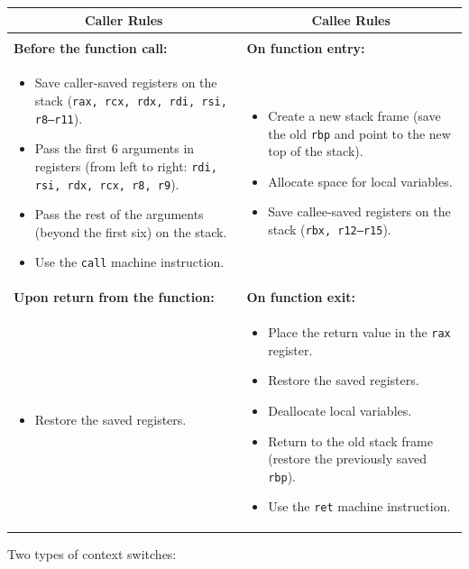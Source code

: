 \documentclass[openany,12pt]{book}
\begin{document}
\begin{tabularx}{\textwidth}{|X|X|}
\hline
\multicolumn{1}{|c|}{\textbf{Caller Rules}} & \multicolumn{1}{c|}{\textbf{Callee Rules}} \\
\hline
 & \\
\textbf{Before the function call:} & \textbf{On function entry:} \\
\begin{itemize}
    \item Save caller-saved registers on the stack (\texttt{rax, rcx, rdx, rdi, rsi, r8–r11}).
    \item Pass the first 6 arguments in registers (from left to right: \texttt{rdi, rsi, rdx, rcx, r8, r9}).
    \item Pass the rest of the arguments (beyond the first six) on the stack.
    \item Use the \texttt{call} machine instruction.
\end{itemize}
&
\begin{itemize}
    \item Create a new stack frame (save the old \texttt{rbp} and point to the new top of the stack).
    \item Allocate space for local variables.
    \item Save callee-saved registers on the stack (\texttt{rbx, r12–r15}).
\end{itemize}
\\
\textbf{Upon return from the function:} & \textbf{On function exit:} \\
\begin{itemize}
    \item Restore the saved registers.
\end{itemize}
&
\begin{itemize}
    \item Place the return value in the \texttt{rax} register.
    \item Restore the saved registers.
    \item Deallocate local variables.
    \item Return to the old stack frame (restore the previously saved \texttt{rbp}).
    \item Use the \texttt{ret} machine instruction.
\end{itemize}
\\
\hline
\end{tabularx}

{\centering Two types of context switches:}
\end{document}
